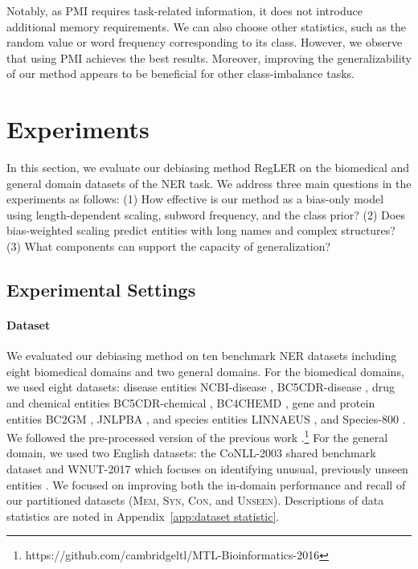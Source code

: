 \documentclass[11pt]{article}
\begin{document}
Notably, as PMI requires task-related information, it does not introduce additional memory requirements.
We can also choose other statistics, such as the random value or word frequency corresponding to its class.
However, we observe that using PMI achieves the best results.
Moreover, improving the generalizability of our method appears to be beneficial for other class-imbalance tasks.


\section{Experiments}
In this section, we evaluate our debiasing method RegLER on the biomedical and general domain datasets of the NER task.
We address three main questions in the experiments as follows: 
(1) How effective is our method as a bias-only model using length-dependent scaling, subword frequency, and the class prior? (2) Does bias-weighted scaling predict entities with long names and complex structures? (3) What components can support the capacity of generalization?

\subsection{Experimental Settings}

\paragraph{Dataset}
We evaluated our debiasing method on ten benchmark NER datasets including eight biomedical domains and two general domains.
For the biomedical domains, we used eight datasets: disease entities NCBI-disease \cite{dougan2014ncbi}, BC5CDR-disease \cite{li2016biocreative}, drug and chemical entities BC5CDR-chemical \cite{li2016biocreative}, BC4CHEMD \cite{krallinger2015chemdner}, gene and protein entities BC2GM \cite{smith2008overview}, JNLPBA \cite{kim2004introduction}, and species entities LINNAEUS \cite{gerner2010linnaeus}, and Species-800 \cite{pafilis2013species}. 
We followed the pre-processed version of the previous work \cite{crichton2017neural}.\footnote{https://github.com/cambridgeltl/MTL-Bioinformatics-2016}
For the general domain, we used two English datasets: the CoNLL-2003 shared benchmark dataset \cite{sang2003introduction} and WNUT-2017 which focuses on identifying unusual, previously unseen entities \cite{derczynski2017results}.
We focused on improving both the in-domain performance and recall of our partitioned datasets (\textsc{Mem}, \textsc{Syn}, \textsc{Con}, and \textsc{Unseen}).
Descriptions of data statistics are noted in Appendix~\ref{app:dataset statistic}.
\end{document}

